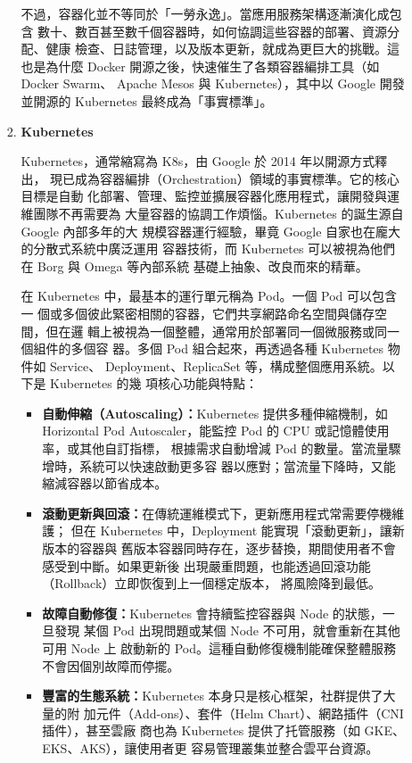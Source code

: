 \documentclass[12pt,a4paper]{article}
\begin{document}
\begin{enumerate}[label={(\zhdig*)}, leftmargin=2\parindent, listparindent=\parindent]
\begin{enumerate}[label={(\arabic*)}, leftmargin=\parindent, listparindent=\parindent]
\begin{enumerate}[label={(\zhdig*)}, leftmargin=2\parindent, listparindent=\parindent]
不過，容器化並不等同於「一勞永逸」。當應用服務架構逐漸演化成包含
數十、數百甚至數千個容器時，如何協調這些容器的部署、資源分配、健康
檢查、日誌管理，以及版本更新，就成為更巨大的挑戰。這也是為什麼
Docker 開源之後，快速催生了各類容器編排工具（如 Docker Swarm、
Apache Mesos 與 Kubernetes），其中以 Google 開發並開源的 Kubernetes
最終成為「事實標準」。

\item\textbf{
Kubernetes
}

Kubernetes，通常縮寫為 K8s，由 Google 於 2014 年以開源方式釋出，
現已成為容器編排（Orchestration）領域的事實標準。它的核心目標是自動
化部署、管理、監控並擴展容器化應用程式，讓開發與運維團隊不再需要為
大量容器的協調工作煩惱。Kubernetes 的誕生源自 Google 內部多年的大
規模容器運行經驗，畢竟 Google 自家也在龐大的分散式系統中廣泛運用
容器技術，而 Kubernetes 可以被視為他們在 Borg 與 Omega 等內部系統
基礎上抽象、改良而來的精華。

在 Kubernetes 中，最基本的運行單元稱為 Pod。一個 Pod 可以包含一
個或多個彼此緊密相關的容器，它們共享網路命名空間與儲存空間，但在邏
輯上被視為一個整體，通常用於部署同一個微服務或同一個組件的多個容
器。多個 Pod 組合起來，再透過各種 Kubernetes 物件如 Service、
Deployment、ReplicaSet 等，構成整個應用系統。以下是 Kubernetes 的幾
項核心功能與特點：

\begin{itemize}[leftmargin=\parindent, listparindent=\parindent]
\item\textbf{
自動伸縮（Autoscaling）：}Kubernetes 提供多種伸縮機制，如 Horizontal
Pod Autoscaler，能監控 Pod 的 CPU 或記憶體使用率，或其他自訂指標，
根據需求自動增減 Pod 的數量。當流量驟增時，系統可以快速啟動更多容
器以應對；當流量下降時，又能縮減容器以節省成本。

    \item\textbf{
滾動更新與回滾：}在傳統運維模式下，更新應用程式常需要停機維護；
但在 Kubernetes 中，Deployment 能實現「滾動更新」，讓新版本的容器與
舊版本容器同時存在，逐步替換，期間使用者不會感受到中斷。如果更新後
出現嚴重問題，也能透過回滾功能（Rollback）立即恢復到上一個穩定版本，
將風險降到最低。

    \item\textbf{
故障自動修復：}Kubernetes 會持續監控容器與 Node 的狀態，一旦發現
某個 Pod 出現問題或某個 Node 不可用，就會重新在其他可用 Node 上
啟動新的 Pod。這種自動修復機制能確保整體服務不會因個別故障而停擺。

    \item\textbf{
豐富的生態系統：}Kubernetes 本身只是核心框架，社群提供了大量的附
加元件（Add-ons）、套件（Helm Chart）、網路插件（CNI 插件），甚至雲廠
商也為 Kubernetes 提供了托管服務（如 GKE、EKS、AKS），讓使用者更
容易管理叢集並整合雲平台資源。


\end{itemize}
\end{enumerate}
\end{enumerate}
\end{enumerate}
\end{document}
